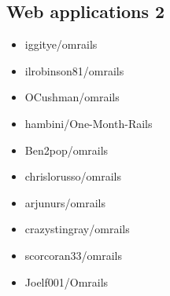 \documentclass[conference,10pt]{IEEEtran}
\begin{document}
\subsection{Web applications 2}
\begin{itemize}
\item iggitye/omrails
\item ilrobinson81/omrails
\item OCushman/omrails
\item hambini/One-Month-Rails
\item Ben2pop/omrails
\item chrislorusso/omrails
\item arjunurs/omrails
\item crazystingray/omrails
\item scorcoran33/omrails
\item Joelf001/Omrails
\end{itemize}
\end{document}
